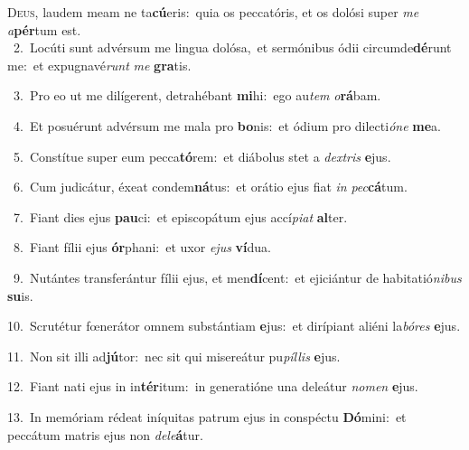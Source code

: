\lettrine{\initial\textcolor{\initialcolor}{D}}{eus,} laudem meam ne ta\-\textbf{cú}\-eris:~\star quia os peccatóris, et os dolósi super \textit{me} \textit{a}\-\textbf{pér}tum est.\\
{\numbfont\textcolor{\numbcolor}{~2.}}~Locúti sunt advérsum me lingua dolósa,~\dagger et sermónibus ódii circumde\-\textbf{dé}\-runt me:~\star et expugnavé\textit{runt} \textit{me} \textbf{gra}\-tis.\par
{\numbfont\textcolor{\numbcolor}{~3.}}~Pro eo ut me dilígerent, detrahébant \textbf{mi}\-hi:~\star ego au\textit{tem} \textit{o}\-\textbf{rá}bam.\par
{\numbfont\textcolor{\numbcolor}{~4.}}~Et posuérunt advérsum me mala pro \textbf{bo}\-nis:~\star et ódium pro dilecti\-\textit{ó}\-\textit{ne} \textbf{me}\-a.\par
{\numbfont\textcolor{\numbcolor}{~5.}}~Constítue super eum pecca\-\textbf{tó}\-rem:~\star et diábolus stet a \textit{dex}\-\textit{tris} \textbf{e}\-jus.\par
{\numbfont\textcolor{\numbcolor}{~6.}}~Cum judicátur, éxeat condem\-\textbf{ná}\-tus:~\star et orátio ejus fiat \textit{in} \textit{pec}\-\textbf{cá}tum.\par
{\numbfont\textcolor{\numbcolor}{~7.}}~Fiant dies ejus \textbf{pau}\-ci:~\star et episcopátum ejus accí\-\textit{pi}\-\textit{at} \textbf{al}\-ter.\par
{\numbfont\textcolor{\numbcolor}{~8.}}~Fiant fílii ejus \textbf{ór}\-phani:~\star et uxor \textit{e}\-\textit{jus} \textbf{ví}\-dua.\par
{\numbfont\textcolor{\numbcolor}{~9.}}~Nutántes transferántur fílii ejus, et men\-\textbf{dí}\-cent:~\star et ejiciántur de habitatió\-\textit{ni}\-\textit{bus} \textbf{su}\-is.\par
{\numbfont\textcolor{\numbcolor}{10.}}~Scrutétur fœnerátor omnem substántiam \textbf{e}\-jus:~\star et dirípiant aliéni la\-\textit{bó}\-\textit{res} \textbf{e}\-jus.\par
{\numbfont\textcolor{\numbcolor}{11.}}~Non sit illi ad\-\textbf{jú}\-tor:~\star nec sit qui misereátur pu\-\textit{píl}\-\textit{lis} \textbf{e}\-jus.\par
{\numbfont\textcolor{\numbcolor}{12.}}~Fiant nati ejus in in\-\textbf{tér}\-itum:~\star in generatióne una deleátur \textit{no}\-\textit{men} \textbf{e}\-jus.\par
{\numbfont\textcolor{\numbcolor}{13.}}~In memóriam rédeat iníquitas patrum ejus in conspéctu \textbf{Dó}\-mini:~\star et peccátum matris ejus non \textit{de}\-\textit{le}\textbf{á}tur.\par
